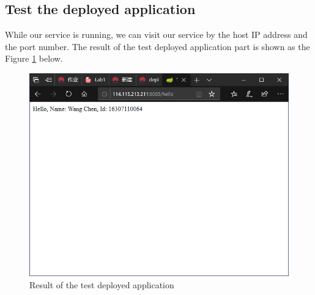 \documentclass[a4paper]{report}
\begin{document}
\subsection{Test the deployed application}
While our service is running, we can visit our service by the host IP address and the port number. The result of the test deployed application part is shown as the Figure \ref{14} below.
\begin{figure}
  \centering
  \includegraphics[width=12cm]{Figures/Capture11.png}
  \caption{Result of the test deployed application}\label{14}
\end{figure}
\end{document}
